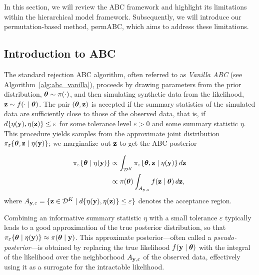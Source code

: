 
In this section, we will review the ABC framework and highlight its limitations within the hierarchical model framework. Subsequently, we will introduce our permutation-based method, permABC, which aims to address these limitations.

\subsection{Introduction to ABC}


The standard rejection ABC algorithm, often referred to as \emph{Vanilla ABC} (see Algorithm~\ref{alg:abc_vanilla}), proceeds by drawing parameters from the prior distribution, $\boldsymbol{\theta} \sim \pi(\cdot)$, and then simulating synthetic data from the likelihood, $\mathbf{z} \sim f(\cdot \mid \boldsymbol{\theta})$. The pair $(\boldsymbol{\theta}, \mathbf{z})$ is accepted if the summary statistics of the simulated data are sufficiently close to those of the observed data, that is, if $d\{\eta(\mathbf{y}), \eta(\mathbf{z})\} \leq \varepsilon$ for some tolerance level $\varepsilon > 0$ and some summary statistic $\eta$. This procedure yields samples from the approximate joint distribution $\pi_{\varepsilon}\{\boldsymbol{\theta},\mathbf{z} \mid \eta(\mathbf{y})\}$; we marginalize out $\mathbf{z}$ to get the ABC posterior

\begin{equation}
    \label{eqabc}
    \begin{split}
        \pi_{\varepsilon}\{\boldsymbol{\theta} \mid \eta(\mathbf{y})\} &\propto
        \int_{\mathcal{D}^K} \pi_{\varepsilon}\{\boldsymbol{\theta}, \mathbf{z} \mid \eta(\mathbf{y})\} \, d\mathbf{z} \\
        &\propto \pi(\boldsymbol{\theta}) \int_{A_{\mathbf{y},\varepsilon}} f(\mathbf{z} \mid \boldsymbol{\theta}) \, d\mathbf{z},
    \end{split}
\end{equation}
where $A_{\mathbf{y},\varepsilon} = \{\mathbf{z} \in \mathcal{D}^K \mid d\{\eta(\mathbf{y}), \eta(\mathbf{z})\} \leq \varepsilon\}$ denotes the acceptance region.

Combining an informative summary statistic $\eta$ with a small tolerance $\varepsilon$ typically leads to a good approximation of the true posterior distribution, so that $\pi_{\varepsilon}\{\boldsymbol{\theta} \mid \eta(\mathbf{y})\} \approx \pi(\boldsymbol{\theta} \mid \mathbf{y})$. This approximate posterior—often called a \emph{pseudo-posterior}—is obtained by replacing the true likelihood $f(\mathbf{y} \mid \boldsymbol{\theta})$ with the integral of the likelihood over the neighborhood $A_{\mathbf{y},\varepsilon}$ of the observed data, effectively using it as a surrogate for the intractable likelihood.


